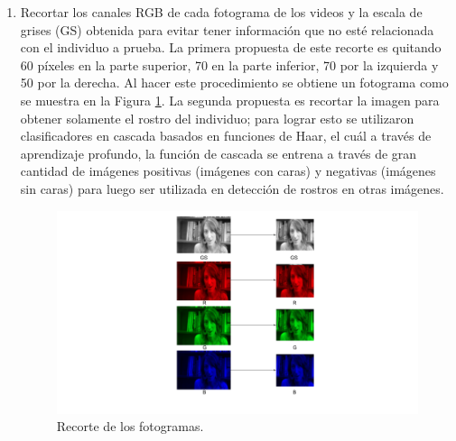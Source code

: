 \begin{onehalfspacing}
\begin{enumerate}
    \item Recortar los canales RGB de cada fotograma de los videos y la escala de grises (GS) obtenida para evitar tener información que no esté relacionada con el individuo a prueba. La primera propuesta de este recorte es quitando 60 píxeles en la parte superior, 70 en la parte inferior, 70 por la izquierda y 50 por la derecha. Al hacer este procedimiento se obtiene un fotograma como se muestra en la Figura \ref{fig:Fig_Dataset1_Recorte}. La segunda propuesta es recortar la imagen para obtener solamente el rostro del individuo; para lograr esto se utilizaron clasificadores en cascada basados en funciones de Haar, el cuál a través de aprendizaje profundo, la función de cascada se entrena a través de gran cantidad de imágenes positivas (imágenes con caras) y negativas (imágenes sin caras) para luego ser utilizada en detección de rostros en otras imágenes.  
    \begin{figure}[h!]
    	\centering
    	\includegraphics[width=12cm,keepaspectratio]{XX_Figures/Fig_Dataset1_Recorte.png}
    	\caption{\footnotesize Recorte de los fotogramas.}
    	\label{fig:Fig_Dataset1_Recorte}
    \end{figure}


\end{enumerate}
\end{onehalfspacing}
